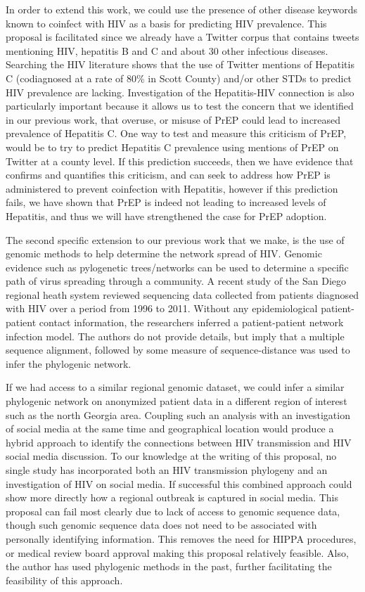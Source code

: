 In order to extend this work, we could use the presence of other disease keywords known to coinfect with HIV as a basis for predicting HIV prevalence. This proposal is facilitated since we already have a Twitter corpus that contains tweets mentioning HIV, hepatitis B and C and about 30 other infectious diseases. Searching the HIV literature shows that the use of Twitter mentions of Hepatitis C (codiagnosed at a rate of 80\% in Scott County) and/or other STDs to predict HIV prevalence are lacking. Investigation of the Hepatitis-HIV connection is also particularly important because it allows us to test the concern that we identified in our previous work, that overuse, or misuse of PrEP could lead to increased prevalence of Hepatitis C. One way to test and measure this criticism of PrEP, would be to try to predict Hepatitis C prevalence using mentions of PrEP on Twitter at a county level. If this prediction succeeds, then we have evidence that confirms and quantifies this criticism, and can seek to address how PrEP is administered to prevent coinfection with Hepatitis, however if this prediction fails, we have shown that PrEP is indeed not leading to increased levels of Hepatitis, and thus we will have strengthened the case for PrEP adoption.

The second specific extension to our previous work that we make, is the use of genomic methods to help determine the network spread of HIV. Genomic evidence such as pylogenetic trees/networks can be used to determine a specific path of virus spreading through a community. A recent study of the San Diego regional heath system reviewed sequencing data collected from patients diagnosed with HIV over a period from 1996 to 2011\cite{little2014using}. Without any epidemiological patient-patient contact information, the researchers inferred a patient-patient network infection model. The authors do not provide details, but imply that a multiple sequence alignment, followed by some measure of sequence-distance was used to infer the phylogenic network.

If we had access to a similar regional genomic dataset, we could infer a similar phylogenic network on anonymized patient data in a different region of interest such as the north Georgia area. Coupling such an analysis with an investigation of social media at the same time and geographical location would produce a hybrid approach to identify the connections between HIV transmission and HIV social media discussion. To our knowledge at the writing of this proposal, no single study has incorporated both an HIV transmission phylogeny and an investigation of HIV on social media. If successful this combined approach could show more directly how a regional outbreak is captured in social media. This proposal can fail most clearly due to lack of access to genomic sequence data, though such genomic sequence data does not need to be associated with personally identifying information. This removes the need for HIPPA procedures, or medical review board approval making this proposal relatively feasible. Also, the author has used phylogenic methods in the past, further facilitating the feasibility of this approach.

